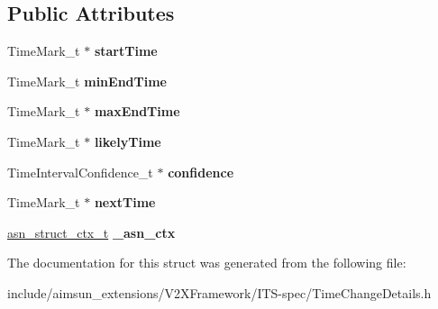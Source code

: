 \subsection*{Public Attributes}
\begin{DoxyCompactItemize}
\item 
Time\+Mark\+\_\+t $\ast$ {\bfseries start\+Time}\hypertarget{structTimeChangeDetails_a907672cfedcebb30f6797c11c6dcbb6b}{}\label{structTimeChangeDetails_a907672cfedcebb30f6797c11c6dcbb6b}

\item 
Time\+Mark\+\_\+t {\bfseries min\+End\+Time}\hypertarget{structTimeChangeDetails_a353c3145ba7260e704928d12fc71abef}{}\label{structTimeChangeDetails_a353c3145ba7260e704928d12fc71abef}

\item 
Time\+Mark\+\_\+t $\ast$ {\bfseries max\+End\+Time}\hypertarget{structTimeChangeDetails_a9cdfa18f684199a5ab27843a7b672a54}{}\label{structTimeChangeDetails_a9cdfa18f684199a5ab27843a7b672a54}

\item 
Time\+Mark\+\_\+t $\ast$ {\bfseries likely\+Time}\hypertarget{structTimeChangeDetails_a01896a9e7b5a571f5d1b2d513d3175c8}{}\label{structTimeChangeDetails_a01896a9e7b5a571f5d1b2d513d3175c8}

\item 
Time\+Interval\+Confidence\+\_\+t $\ast$ {\bfseries confidence}\hypertarget{structTimeChangeDetails_a4ed2c2e9f3689b35decea8e9cccd1335}{}\label{structTimeChangeDetails_a4ed2c2e9f3689b35decea8e9cccd1335}

\item 
Time\+Mark\+\_\+t $\ast$ {\bfseries next\+Time}\hypertarget{structTimeChangeDetails_ae6dd1159ae74ba3b8522581d834886d9}{}\label{structTimeChangeDetails_ae6dd1159ae74ba3b8522581d834886d9}

\item 
\hyperlink{structasn__struct__ctx__s}{asn\+\_\+struct\+\_\+ctx\+\_\+t} {\bfseries \+\_\+asn\+\_\+ctx}\hypertarget{structTimeChangeDetails_ae82a17ea5a15a5c4215a41cdd972704d}{}\label{structTimeChangeDetails_ae82a17ea5a15a5c4215a41cdd972704d}

\end{DoxyCompactItemize}


The documentation for this struct was generated from the following file\+:\begin{DoxyCompactItemize}
\item 
include/aimsun\+\_\+extensions/\+V2\+X\+Framework/\+I\+T\+S-\/spec/Time\+Change\+Details.\+h\end{DoxyCompactItemize}
